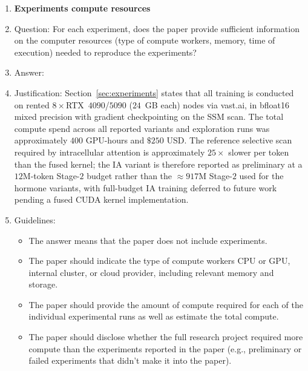 \begin{enumerate}
\begin{itemize}
        \item It is OK to report 1-sigma error bars, but one should state it. The authors should preferably report a 2-sigma error bar than state that they have a 96\% CI, if the hypothesis of Normality of errors is not verified.
        \item For asymmetric distributions, the authors should be careful not to show in tables or figures symmetric error bars that would yield results that are out of range (e.g., negative error rates).
        \item If error bars are reported in tables or plots, the authors should explain in the text how they were calculated and reference the corresponding figures or tables in the text.
    \end{itemize}

\item {\bf Experiments compute resources}
    \item[] Question: For each experiment, does the paper provide sufficient information on the computer resources (type of compute workers, memory, time of execution) needed to reproduce the experiments?
    \item[] Answer: \answerYes{}
    \item[] Justification: Section~\ref{sec:experiments} states that all training is conducted on rented $8\times$RTX~$4090$/$5090$ ($24$~GB each) nodes via vast.ai, in bfloat16 mixed precision with gradient checkpointing on the SSM scan. The total compute spend across all reported variants and exploration runs was approximately $400$ GPU-hours and $\$250$ USD. The reference selective scan required by intracellular attention is approximately $25\times$ slower per token than the fused kernel; the IA variant is therefore reported as preliminary at a $12$M-token Stage-$2$ budget rather than the $\approx 917$M Stage-$2$ used for the hormone variants, with full-budget IA training deferred to future work pending a fused CUDA kernel implementation.
    \item[] Guidelines:
    \begin{itemize}
        \item The answer \answerNA{} means that the paper does not include experiments.
        \item The paper should indicate the type of compute workers CPU or GPU, internal cluster, or cloud provider, including relevant memory and storage.
        \item The paper should provide the amount of compute required for each of the individual experimental runs as well as estimate the total compute. 
        \item The paper should disclose whether the full research project required more compute than the experiments reported in the paper (e.g., preliminary or failed experiments that didn't make it into the paper). 
    \end{itemize}
    

\end{enumerate}
